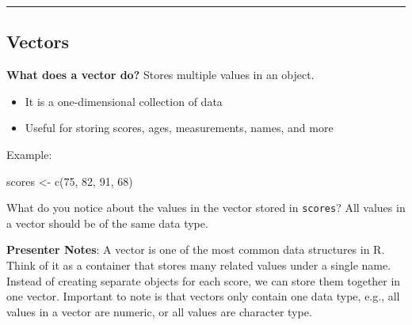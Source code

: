 \documentclass[
  letterpaper,
  DIV=11,
  numbers=noendperiod]{scrartcl}
\newenvironment{Shaded}{\begin{snugshade}}{\end{snugshade}}
\newcommand{\DecValTok}[1]{\textcolor[rgb]{0.68,0.00,0.00}{#1}}
\newcommand{\FunctionTok}[1]{\textcolor[rgb]{0.28,0.35,0.67}{#1}}
\newcommand{\NormalTok}[1]{\textcolor[rgb]{0.00,0.23,0.31}{#1}}
\newcommand{\OtherTok}[1]{\textcolor[rgb]{0.00,0.23,0.31}{#1}}
\providecommand{\tightlist}{%
  \setlength{\itemsep}{0pt}\setlength{\parskip}{0pt}}
\begin{document}
\begin{center}\rule{0.5\linewidth}{0.5pt}\end{center}

\subsection{Vectors}\label{vectors}

\textbf{What does a vector do?} Stores multiple values in an object.

\begin{itemize}
\tightlist
\item
  It is a one-dimensional collection of data
\item
  Useful for storing scores, ages, measurements, names, and more
\end{itemize}

Example:

\begin{Shaded}
\begin{Highlighting}[]
\NormalTok{scores }\OtherTok{\textless{}{-}} \FunctionTok{c}\NormalTok{(}\DecValTok{75}\NormalTok{, }\DecValTok{82}\NormalTok{, }\DecValTok{91}\NormalTok{, }\DecValTok{68}\NormalTok{)}
\end{Highlighting}
\end{Shaded}

\begin{tcolorbox}[enhanced jigsaw, arc=.35mm, bottomrule=.15mm, bottomtitle=1mm, breakable, colback=white, colbacktitle=quarto-callout-tip-color!10!white, colframe=quarto-callout-tip-color-frame, coltitle=black, left=2mm, leftrule=.75mm, opacityback=0, opacitybacktitle=0.6, rightrule=.15mm, title=\textcolor{quarto-callout-tip-color}{\faLightbulb}\hspace{0.5em}{Vectors and data type}, titlerule=0mm, toprule=.15mm, toptitle=1mm]

What do you notice about the values in the vector stored in
\texttt{scores}? All values in a vector should be of the same data type.

\end{tcolorbox}

\textbf{Presenter Notes}: A vector is one of the most common data
structures in R. Think of it as a container that stores many related
values under a single name. Instead of creating separate objects for
each score, we can store them together in one vector. Important to note
is that vectors only contain one data type, e.g., all values in a vector
are numeric, or all values are character type.
\end{document}
